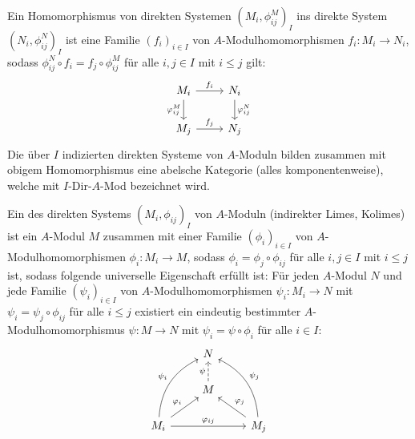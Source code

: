 \begin{bem+df}\label{16.4}
	Ein Homomorphismus von direkten Systemen $(M_i, \phi_{ij}^M)_I$ ins direkte System $(N_i, \phi_{ij}^N)_I$ ist eine Familie $(f_i)_{i\in I}$ von $A$-Modulhomomorphismen $f_i:M_i \to N_i$, sodass $\phi_{ij}^N \circ f_i = f_j \circ \phi_{ij}^M$ für alle $i,j\in I$ mit $i\leq j$ gilt:
	$$\begin{tikzcd}
	M_i \arrow{r}{f_i} \arrow[swap]{d}{\phi_{ij}^M} & N_i \arrow{d}{\phi_{ij}^N}\\
	M_j \arrow{r}{f_j} & N_j
	\end{tikzcd}$$
	Die über $I$ indizierten direkten Systeme von $A$-Moduln bilden zusammen mit obigem Homomorphismus eine abelsche Kategorie (alles komponentenweise), welche mit $I$-Dir-$A$-Mod bezeichnet wird.
\end{bem+df}
\begin{df}\label{16.5}
	Ein  des direkten Systems $(M_i, \phi_{ij})_I$ von $A$-Moduln (indirekter Limes, Kolimes) ist ein $A$-Modul $M$ zusammen mit einer Familie $(\phi_i)_{i\in I}$ von $A$-Modulhomomorphismen $\phi_i:M_i \to M$, sodass $\phi_i = \phi_j \circ \phi_{ij}$ für alle $i,j\in I$ mit $i\leq j$ ist, sodass folgende universelle Eigenschaft erfüllt ist: Für jeden $A$-Modul $N$ und jede Familie $(\psi_i)_{i\in I}$ von $A$-Modulhomomorphismen $\psi_i :M_i \to N$ mit $\psi_i = \psi_j \circ \phi_{ij}$ für alle $i\leq j$ existiert ein eindeutig bestimmter $A$-Modulhomomorphismus $\psi:M \to N$ mit $\psi_i = \psi \circ \phi_i$ für alle $i\in I$:
	$$\begin{tikzcd}
	& N & \\
	& M \arrow[dashed]{u}{\psi}& \\
	M_i \arrow{ur}{\phi_i} \arrow[bend left]{uur}{\psi_i} \arrow{rr}{\phi_{ij}} & & M_j \arrow[swap]{ul}{\phi_j} \arrow[bend right, swap]{uul}{\psi_j}
	\end{tikzcd}$$
\end{df}
